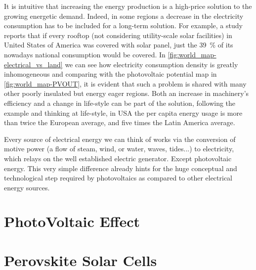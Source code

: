 	 It is intuitive that increasing the energy production is a high-price solution to the growing energetic demand.
	Indeed, in some regions a decrease in the electricity consumption has to be included for a long-term solution.
	For example, a study\cite{Margolis2016} reports that if every rooftop (not considering utility-scale solar facilities) in United States of America was covered with solar panel, just the 39~\% of its nowadays national consumption would be covered.
	In \cref{fig:world_map-electrical_vs_land} we can see how electricity consumption density is greatly inhomogeneous and comparing with the photovoltaic potential map in \cref{fig:world_map-PVOUT}, it is evident that such a problem is shared with many other poorly insulated but energy eager regions.
	Both an increase in machinery's efficiency and a change in life-style can be part of the solution, following the example and thinking at life-style, in USA the per capita energy usage is more than twice the European average, and five times the Latin America average.\cite{IEA}

	 Every source of electrical energy we can think of works via the conversion of motive power (a flow of steam, wind, or water, waves, tides...) to electricity, which relays on the well established electric generator. Except photovoltaic energy. This very simple difference already hints for the huge conceptual and technological step required by photovoltaics as compared to other electrical energy sources.
	

\section{PhotoVoltaic Effect}







\section{Perovskite Solar Cells}

